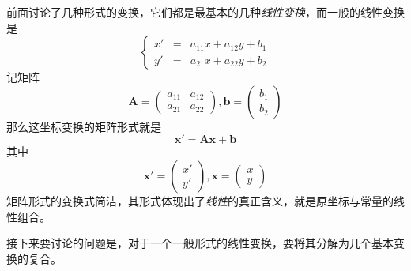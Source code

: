 前面讨论了几种形式的变换，它们都是最基本的几种\emph{线性变换}，而一般的线性变换是
\begin{equation*}
  \left\{
    \begin{array}{ccc}
      x' & = &  a_{11}x+a_{12}y+b_1 \\
      y' & = &  a_{21}x+a_{22}y+b_2
    \end{array}
    \right.
  \end{equation*}
  记矩阵
  \[ \bm{A} =
     \left(
      \begin{array}{cc}
        a_{11} & a_{12} \\
        a_{21} & a_{22}
      \end{array}
    \right),
    \bm{b}=
    \left(
      \begin{array}{c}
        b_1 \\
        b_2
      \end{array}
      \right)
  \]
  那么这坐标变换的矩阵形式就是
  \[ \bm{x'} = \bm{A}\bm{x}+\bm{b}  \]
  其中
  \[ \bm{x'}=
    \left(
      \begin{array}{c}
        x' \\
        y'
      \end{array}
    \right),
    \bm{x} =
    \left(
      \begin{array}{c}
        x \\
        y
      \end{array}
    \right)
  \]
矩阵形式的变换式简洁，其形式体现出了\emph{线性}的真正含义，就是原坐标与常量的线性组合。

接下来要讨论的问题是，对于一个一般形式的线性变换，要将其分解为几个基本变换的复合。



